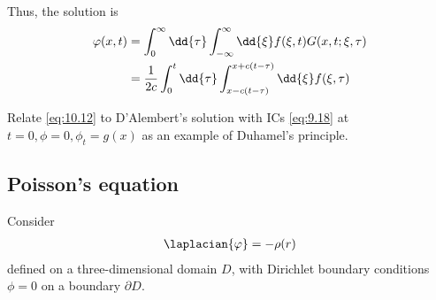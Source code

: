 Thus, the solution is
\begin{align} \label{eq:10.12}
	\phi(x,t) &= \int_0^\infty \dd{\tau} \int_{-\infty}^\infty \dd{\xi} f(\xi, t) G(x,t;\xi,\tau) \notag \\
	&= \frac{1}{2c} \int_0^t \dd{\tau} \int_{x - c(t-\tau)}^{x + c(t - \tau)} \dd{\xi} f(\xi, \tau)
\end{align}

\begin{exercise}
	Relate \cref{eq:10.12} to D'Alembert's solution with ICs \cref{eq:9.18} at $t = 0, \phi = 0, \phi_t = g(x)$ as an example of Duhamel's principle.
\end{exercise} 

\subsection{Poisson's equation}
Consider
\begin{align} \label{eq:10.13}
	\laplacian{\phi} = - \rho(r)
\end{align}
defined on a three-dimensional domain $D$, with Dirichlet boundary conditions $\phi = 0$ on a boundary $\partial D$.

